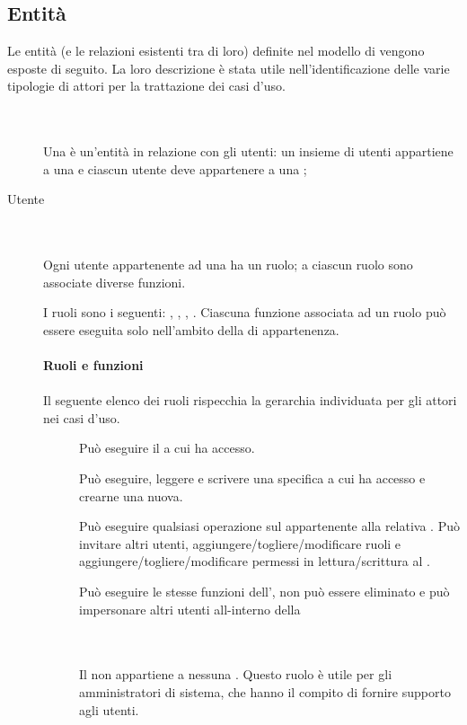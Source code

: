 \subsection{Entit\`a}
Le entit\`a (e le relazioni esistenti tra di loro) definite nel modello  di  vengono esposte di seguito. La loro descrizione \`e stata utile nell'identificazione delle varie tipologie di attori per la trattazione dei casi d'uso.
\begin{description}
	\item[] \hfill \\\\
	Una  \`e un'entit\`a in relazione con gli utenti: un insieme di utenti appartiene a una  e ciascun utente deve appartenere a una ;
	\item[Utente] \hfill \\\\
	Ogni utente appartenente ad una  ha un ruolo; a ciascun ruolo sono associate diverse funzioni.	
	
	I ruoli sono i seguenti: , , , .	
	Ciascuna funzione associata ad un ruolo pu\`o essere eseguita solo nell'ambito della  di appartenenza. \\\\
	\textbf{Ruoli e funzioni} \hfill \\\\
		Il seguente elenco dei ruoli rispecchia la gerarchia individuata per gli attori nei casi d'uso.
		\begin{description}
			\item[] Pu\`o eseguire il  a cui ha accesso.
			\item[] Pu\`o eseguire, leggere e scrivere una specifica  a cui ha accesso e crearne una nuova.
			\item[] Pu\`o eseguire qualsiasi operazione sul  appartenente alla relativa . Pu\`o invitare altri utenti, aggiungere/togliere/modificare ruoli e aggiungere/togliere/modificare permessi in lettura/scrittura al .
			\item[] Pu\`o eseguire le stesse funzioni dell', non pu\`o essere eliminato e pu\`o impersonare altri utenti all-interno della 
                        \item[] \hfill \\\\
	Il  non appartiene a nessuna . Questo ruolo \`e utile per gli amministratori di sistema, che hanno il compito di fornire supporto agli utenti.
		\end{description}
\end{description}

\newpage
